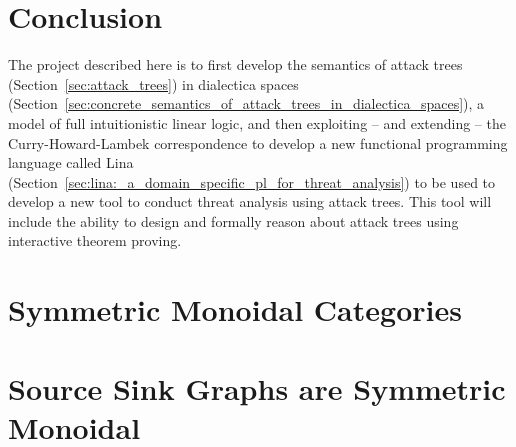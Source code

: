\documentclass{llncs}
\begin{document}
\cite{Retore:1997}

\section{Conclusion}
\label{sec:conclusion}

The project described here is to first develop the semantics of attack
trees (Section~\ref{sec:attack_trees}) in dialectica spaces
(Section~\ref{sec:concrete_semantics_of_attack_trees_in_dialectica_spaces}),
a model of full intuitionistic linear logic, and then exploiting --
and extending -- the Curry-Howard-Lambek correspondence to develop a
new functional programming language called Lina
(Section~\ref{sec:lina:_a_domain_specific_pl_for_threat_analysis}) to
be used to develop a new tool to conduct threat analysis using attack
trees.  This tool will include the ability to design and formally
reason about attack trees using interactive theorem proving.


 

\appendix

\section{Symmetric Monoidal Categories}
\label{sec:symmetric_monoidal_categories}


\section{Source Sink Graphs are Symmetric Monoidal}
\label{sec:source_sink_graphs_are_symmetric_monoidal}

\end{document}

